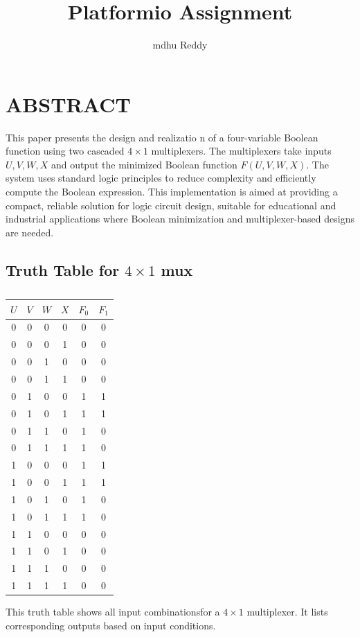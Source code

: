 \documentclass[conference]{IEEEtran}
\title{
\vspace{1cm}
{ Platformio Assignment}}
\author{mdhu Reddy}
\begin{document}
\maketitle
 \section{ABSTRACT}

This paper presents the design and realizatio    n of a four-variable Boolean function using two cascaded $4 \times 1$ multiplexers. The multiplexers take inputs \( U, V, W, X \) and output the minimized Boolean function \( F(U, V, W, X)\).                                       The system uses standard logic principles to     reduce complexity and efficiently compute the     Boolean expression. This implementation is aimed at providing a compact, reliable solution for logic circuit design, suitable for educational and industrial applications where Boolean minimization and multiplexer-based designs are needed.


\subsection{Truth Table for $4 \times 1$ mux}

\begin{table}[htbp]
    \centering
\begin{tabular}
{ | c | c | c | c | c | c | } \hline
$U$ & $V$ & $W$ & $X$ & $F_0$ & $F_1$ \\\hline
0   & 0   & 0   & 0   & 0     & 0 \\
0   & 0   & 0   & 1   & 0     & 0 \\
0   & 0   & 1   & 0   & 0     & 0 \\
0   & 0   & 1   & 1   & 0     & 0 \\
0   & 1   & 0   & 0   & 1     & 1 \\               
0   & 1   & 0   & 1   & 1     & 1 \\
0   & 1   & 1   & 0   & 1     & 0 \\               
0   & 1   & 1   & 1   & 1     & 0 \\
1   & 0   & 0   & 0   & 1     & 1 \\               
1   & 0   & 0   & 1   & 1     & 1 \\
1   & 0   & 1   & 0   & 1     & 0 \\               
1   & 0   & 1   & 1   & 1     & 0 \\               
1   & 1   & 0   & 0   & 0     & 0 \\               
1   & 1   & 0   & 1   & 0     & 0 \\               
1   & 1   & 1   & 0   & 0     & 0 \\               
1   & 1   & 1   & 1   & 0     & 0  \\ \hline
\end{tabular}
\vspace{0.15cm}
\caption{\label{tab:widgets}}
\end{table}
					     This truth table shows all input combinationsfor a $4\times1$ multiplexer. It lists corresponding outputs based on input conditions.
\end{document}
